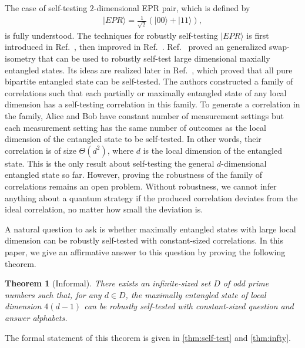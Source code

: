 \documentclass[11pt,letterpaper]{article}
\newcommand{\ket}[1]{|#1\rangle}
\newcommand{\1}{\mathbb{1}}
\newtheorem{theorem}{Theorem}[section]
\theoremstyle{definition}
\begin{document}
The case of self-testing $2$-dimensional EPR pair, which is defined by
\begin{align*}
    \ket{EPR} = \frac{1}{\sqrt{2}}(\ket{00}+\ket{11}),
\end{align*}
is fully understood.
The techniques for robustly self-testing $\ket{EPR}$ is 
first introduced in Ref.~\cite{mckague2012}, then improved in Ref.~\cite{bamps2015}. 
Ref.~\cite{yang2013} proved an generalized swap-isometry
that can be used to robustly self-test large dimensional maxially entangled states.
Its ideas are realized later in Ref.~\cite{coladan2017all}, 
which proved that all pure bipartite entangled state 
can be self-tested.
The authors constructed a family of correlations such
that each partially or maximally entangled state of any local dimension has
a self-testing correlation in this family.
To generate a correlation in the family, Alice and Bob
have constant number of measurement settings but each 
measurement setting has the same number of outcomes as
the local dimension of the entangled state to be self-tested. 
In other words, their correlation is of size $\Theta(d^2)$,
where $d$ is the local dimension of the entangled state.
This is the only result about self-testing the general $d$-dimensional entangled state so far.
However, proving the robustness of the family of correlations remains an open problem. 
Without robustness, we cannot infer anything about a quantum strategy if
the produced correlation deviates from the ideal correlation, no matter how small the 
deviation is. 
 
A natural question to ask is whether maximally entangled states with large local dimension
can be robustly self-tested with constant-sized correlations. 
In this paper, we give an affirmative answer to this question by proving the following theorem.
\begin{theorem}[Informal]
\label{thm:inf}
	There exists an infinite-sized set $D$ of odd prime numbers such that, for any $d \in D$, 
	the maximally entangled state of local dimension $4(d-1)$ can be robustly self-tested 
	with constant-sized question and answer alphabets.
\end{theorem}
The formal statement of this theorem is given in \cref{thm:self-test} and \cref{thm:infty}.
\end{document}
